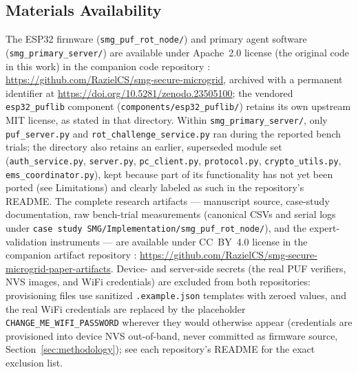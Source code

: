 \documentclass[preprint,12pt,authoryear]{elsarticle}
\begin{document}
\subsection*{Materials Availability}
The ESP32 firmware (\texttt{smg\_puf\_rot\_node/}) and primary agent software (\texttt{smg\_primary\_server/}) are available under Apache~2.0 license (the original code in this work) in the companion code repository \citep{camposSanchez2026codeRepo}: \url{https://github.com/RazielCS/smg-secure-microgrid}, archived with a permanent identifier at \url{https://doi.org/10.5281/zenodo.23505100}; the vendored \texttt{esp32\_puflib} component (\texttt{components/esp32\_puflib/}) retains its own upstream MIT license, as stated in that directory. Within \texttt{smg\_primary\_server/}, only \texttt{puf\_server.py} and \texttt{rot\_challenge\_service.py} ran during the reported bench trials; the directory also retains an earlier, superseded module set (\texttt{auth\_service.py}, \texttt{server.py}, \texttt{pc\_client.py}, \texttt{protocol.py}, \texttt{crypto\_utils.py}, \texttt{ems\_coordinator.py}), kept because part of its functionality has not yet been ported (see Limitations) and clearly labeled as such in the repository's README. The complete research artifacts — manuscript source, case-study documentation, raw bench-trial measurements (canonical CSVs and serial logs under \texttt{case study SMG/\allowbreak Implementation/\allowbreak smg\_puf\_rot\_node/}), and the expert-validation instruments — are available under CC~BY~4.0 license in the companion artifact repository \citep{camposSanchez2026artifactRepo}: \url{https://github.com/RazielCS/smg-secure-microgrid-paper-artifacts}. Device- and server-side secrets (the real PUF verifiers, NVS images, and WiFi credentials) are excluded from both repositories: provisioning files use sanitized \texttt{.example.json} templates with zeroed values, and the real WiFi credentials are replaced by the placeholder \texttt{CHANGE\_ME\_WIFI\_PASSWORD} wherever they would otherwise appear (credentials are provisioned into device NVS out-of-band, never committed as firmware source, Section~\ref{sec:methodology}); see each repository's README for the exact exclusion list.
\end{document}
